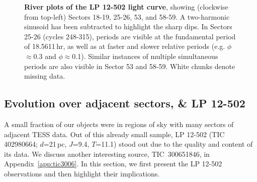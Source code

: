 \documentclass[11pt,twocolumn,tighten]{aastex63}
\begin{document}


\begin{figure*}[!t]
	\begin{center}
		\vspace{-0.2cm}
		
	\end{center}
	\vspace{-0.4cm}
	\caption{
		{\bf River plots of the LP 12-502 light curve}, showing (clockwise
		from top-left) Sectors 18-19, 25-26, 53, and 58-59.  A
		two-harmonic sinusoid has been subtracted to highlight the sharp
		dips.  In Sectors 25-26 (cycles 248-315), periods are visible at
		the fundamental period of 18.5611\,hr, as well as at faster and
		slower relative periods (e.g. $\phi$$\approx$0.3 and
		$\phi$$\approx$0.1).  Similar instances of multiple simultaneous
		periods are also visible in Sector 53 and 58-59.  White chunks
		denote missing data.
	}
	\label{fig:lpriver0}
\end{figure*}


\subsection{Evolution over adjacent sectors, \& LP 12-502}

A small fraction of our objects were in regions of sky with many
sectors of adjacent TESS data.  Out of this already small sample, LP
12-502 (TIC 402980664; $d$=21\,pc, $J$=9.4, $T$=11.1) stood out due to
the quality and content of its data.  We discuss another interesting
source, TIC~300651846, in Appendix~\ref{app:tic3006}.  In this
section, we first present the LP 12-502 observations and then
highlight their implications.
\end{document}
